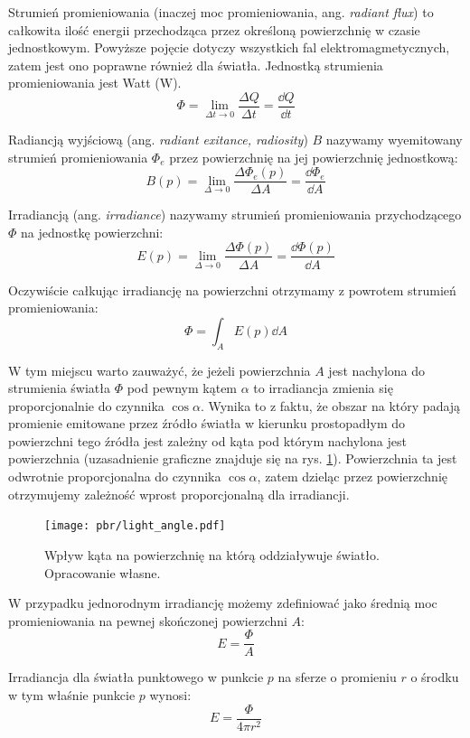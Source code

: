 \documentclass[../main.tex]{subfiles}
\begin{document}
Strumień promieniowania (inaczej moc promieniowania, ang. \textit{radiant flux}) to całkowita ilość energii przechodząca przez określoną powierzchnię w czasie jednostkowym. Powyższe pojęcie dotyczy wszystkich fal elektromagmetycznych, zatem jest ono poprawne również dla światła. Jednostką strumienia promieniowania jest Watt ($\si{\watt}$).
\[
\Phi = 
    \lim_{\Delta t \rightarrow 0}{
        \frac{\Delta Q}{\Delta t}
    } 
    = \frac{\dd Q}{\dd t}
\]

Radiancją wyjściową (ang. \textit{radiant exitance, radiosity}) $B$ nazywamy wyemitowany strumień promieniowania $\Phi_{e}$ przez powierzchnię na jej powierzchnię jednostkową:
\[
B(p) = 
    \lim_{\Delta \rightarrow 0}{
        \frac{\Delta \Phi_{e}(p)}{\Delta A}
    } 
    = \frac{\dd \Phi_{e}}{\dd A}
\]  

Irradiancją (ang. \textit{irradiance}) nazywamy strumień promieniowania przychodzącego $\Phi$ na jednostkę powierzchni:
\[
E(p) =
    \lim_{\Delta \rightarrow 0} {
        \frac{\Delta \Phi(p)}{\Delta A}
    } =
    \frac{\dd \Phi(p)}{\dd A}
\]

Oczywiście całkując irradiancję na powierzchni otrzymamy z powrotem strumień promieniowania:
\[
\Phi = \int_{A} {
    E(p)
    \dd A
}
\]

W tym miejscu warto zauważyć, że jeżeli powierzchnia $A$ jest nachylona do
strumienia światła $\Phi$ pod pewnym kątem $\alpha$ to irradiancja zmienia się
proporcjonalnie do czynnika $\cos \alpha$. Wynika to z faktu, że obszar na
który padają promienie emitowane przez źródło światła w kierunku prostopadłym
do powierzchni tego źródła jest zależny od kąta pod którym nachylona jest
powierzchnia (uzasadnienie graficzne znajduje się na rys. \ref{fig:SourceLightAngle}). Powierzchnia ta jest odwrotnie
proporcjonalna do czynnika $\cos \alpha$, zatem dzieląc przez powierzchnię
otrzymujemy zależność wprost proporcjonalną dla irradiancji.

\begin{figure}[ht]
  \centering
  \texttt{[image: pbr/light\_angle.pdf]}
  \caption{Wpływ kąta na powierzchnię na którą oddziaływuje światło. Opracowanie własne.}
  \label{fig:SourceLightAngle}
\end{figure}

W przypadku jednorodnym irradiancję możemy zdefiniować jako średnią moc
promieniowania na pewnej skończonej powierzchni $A$:
\[
    E = \frac{\Phi}{A}
\]

\begin{example}
  Irradiancja dla światła punktowego w punkcie $p$ na sferze o
  promieniu $r$ o środku w tym właśnie punkcie $p$ wynosi:
  \[
    E = \frac{\Phi}{4 \pi r^2}
  \]
\end{example}
\end{document}
